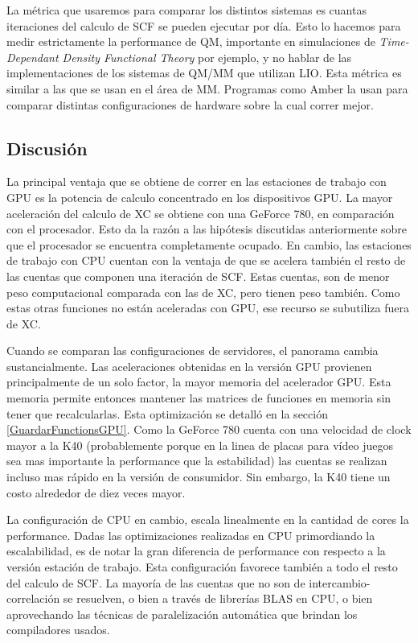 La m\'etrica que usaremos para comparar los distintos sistemas es cuantas iteraciones del calculo de
SCF se pueden ejecutar por d\'ia. Esto lo hacemos para medir estrictamente la performance
de QM, importante en simulaciones de \textit{Time-Dependant Density Functional Theory} por ejemplo, y no
hablar de las implementaciones de los sistemas de QM/MM que utilizan LIO.
Esta m\'etrica es similar a las que se usan en el \'area de MM. Programas como Amber\cite{Amber} la usan para comparar
distintas configuraciones de hardware sobre la cual correr mejor.

\subsection{Discusi\'on}
La principal ventaja que se obtiene de correr en las estaciones de trabajo con GPU es la potencia
de calculo concentrado en los dispositivos GPU. La mayor aceleraci\'on del calculo de XC se obtiene
con una GeForce 780, en comparaci\'on con el procesador. Esto da la raz\'on a las hip\'otesis discutidas
anteriormente sobre que el procesador se encuentra completamente ocupado.
En cambio, las estaciones de trabajo con CPU cuentan con la ventaja de que se acelera tambi\'en el
resto de las cuentas que componen una iteraci\'on de SCF. Estas cuentas, son de menor peso computacional
comparada con las de XC, pero tienen peso tambi\'en. Como estas otras funciones no est\'an
aceleradas con GPU, ese recurso se subutiliza fuera de XC.

Cuando se comparan las configuraciones de servidores, el panorama cambia sustancialmente.
Las aceleraciones obtenidas en la versi\'on GPU provienen principalmente de un solo factor,
la mayor memoria del acelerador GPU. Esta memoria permite entonces mantener las matrices
de funciones en memoria sin tener que recalcularlas. Esta optimizaci\'on se detall\'o en la secci\'on
\ref{GuardarFunctionsGPU}. Como la GeForce 780 cuenta con una velocidad de clock mayor a
la K40 (probablemente porque en la linea de placas para v\'ideo juegos sea mas importante
la performance que la estabilidad) las cuentas se realizan incluso mas r\'apido en la
versi\'on de consumidor. Sin embargo, la K40 tiene un costo alrededor de diez veces mayor.

La configuraci\'on de CPU en cambio, escala linealmente en la cantidad de cores la performance.
Dadas las optimizaciones realizadas en CPU primordiando la escalabilidad, es de notar la gran
diferencia de performance con respecto a la versi\'on estaci\'on de trabajo. Esta configuraci\'on
favorece tambi\'en a todo el resto del calculo de SCF. La mayor\'ia de las cuentas que no son
de intercambio-correlaci\'on se resuelven, o bien a trav\'es de librer\'ias BLAS en CPU, o bien
aprovechando las t\'ecnicas de paralelizaci\'on autom\'atica que brindan los compiladores usados.

